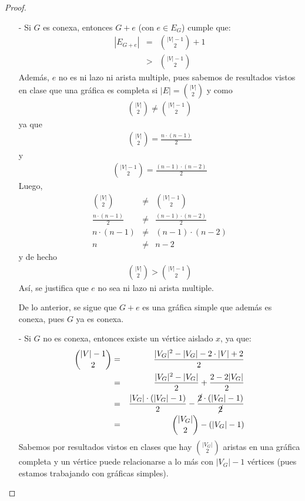 \documentclass{article}
\begin{document}
\begin{enumerate}
\begin{enumerate}
\begin{proof}
        \begin{itemize}
          \item[-] Si $G$ es conexa, entonces $G+e$ (con $e \in E_G$) cumple que:
            \begin{eqnarray*}
              |E_{G +e}| &=& {|V| -1 \choose 2} +1\\
              &>& {|V| -1 \choose 2}
            \end{eqnarray*}
            Además, $e$ no es ni lazo ni arista multiple,
            pues sabemos de resultados vistos en clase que una gráfica es completa si
            $|E| = {|V| \choose 2}$ y como
            \begin{eqnarray*}
              {|V| \choose 2} \not= {|V| -1 \choose 2}
            \end{eqnarray*}
            ya que
            \begin{eqnarray*}
              {|V| \choose 2} = \frac{n \cdot (n -1)}{2}
            \end{eqnarray*}
            y
            \begin{eqnarray*}
              {|V| -1 \choose 2} = \frac{(n -1) \cdot (n -2)}{2}
            \end{eqnarray*}
            Luego,
            \begin{eqnarray*}
              {|V| \choose 2} &\not=& {|V| -1 \choose 2}\\
              \frac{n \cdot (n -1)}{2} &\not=& \frac{(n -1) \cdot (n -2)}{2}\\
              n \cdot (n -1) &\not=& (n -1) \cdot (n -2)\\
              n &\not=& n -2
            \end{eqnarray*}
            y de hecho
            \begin{eqnarray*}
              {|V| \choose 2} > {|V| -1 \choose 2}
            \end{eqnarray*}
            Así, se justifica que $e$ no sea ni lazo ni arista multiple.
            
            De lo anterior, se sigue que $G +e$ es una gráfica simple que además es conexa,
            pues $G$ ya es conexa.

          \item[-] Si $G$ no es conexa, entonces existe un vértice aislado $x$, ya que:
            \begin{eqnarray*}
              {|V| -1 \choose 2} &=& \frac{|V_G|^2 -|V_G| -2 \cdot |V| +2}{2}\\
              &=& \frac{|V_G|^2 -|V_G|}{2} + \frac{2 -2|V_G|}{2}\\
              &=& \frac{|V_G| \cdot (|V_G| -1)}{2} - \frac{\cancel{2} \cdot (|V_G| -1)}{\cancel{2}}\\
              &=& {|V_G| \choose 2} - (|V_G| -1)
            \end{eqnarray*}
            Sabemos por resultados vistos en clases que hay ${|V_G| \choose 2}$ aristas en
            una gráfica completa y un vértice puede relacionarse a lo más con $|V_G| -1$ vértices
            (pues estamos trabajando con gráficas simples).
            

\end{itemize}
\end{proof}
\end{enumerate}
\end{enumerate}
\end{document}
